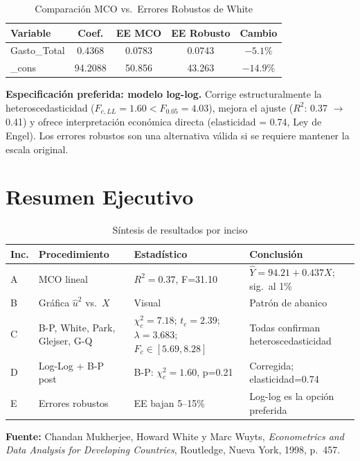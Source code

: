 \documentclass[12pt,a4paper]{article}
\begin{document}
\begin{table}[H]
\centering
\caption{Comparación MCO vs.\ Errores Robustos de White}
\begin{tabular}{lcccc}
\toprule
\textbf{Variable} & \textbf{Coef.} & \textbf{EE MCO} & \textbf{EE Robusto} & \textbf{Cambio}\\
\midrule
Gasto\_Total & 0.4368 & 0.0783 & 0.0743 & $-5.1\%$\\
\_cons       & 94.2088 & 50.856 & 43.263 & $-14.9\%$\\
\bottomrule
\end{tabular}
\end{table}

\begin{cajaconclucion}[title=Decisión Final]
\textbf{Especificación preferida: modelo log-log.}
Corrige estructuralmente la heteroscedasticidad ($F_{c,LL}=1.60 < F_{0.05}=4.03$),
mejora el ajuste ($R^2$: 0.37 $\to$ 0.41) y ofrece interpretación económica directa
(elasticidad = 0.74, Ley de Engel).
Los errores robustos son una alternativa válida si se requiere mantener la escala original.
\end{cajaconclucion}

\section{Resumen Ejecutivo}

\begin{table}[H]
\centering
\caption{Síntesis de resultados por inciso}
\begin{tabular}{p{0.8cm}p{4.5cm}p{3.2cm}p{4.5cm}}
\toprule
\textbf{Inc.} & \textbf{Procedimiento} & \textbf{Estadístico} & \textbf{Conclusión}\\
\midrule
A & MCO lineal & $R^2=0.37$, F=31.10 & $\hat{Y}=94.21+0.437X$; sig.\ al 1\%\\
\addlinespace
B & Gráfica $\hat{u}^2$ vs.\ $X$ & Visual & Patrón de abanico\\
\addlinespace
C & B-P, White, Park, Glejser, G-Q &
  $\chi^2_c=7.18$; $t_c=2.39$; $\lambda=3.683$; $F_c\in[5.69,8.28]$ &
  Todas confirman heteroscedasticidad\\
\addlinespace
D & Log-Log + B-P post & B-P: $\chi^2_c=1.60$, p=0.21 & Corregida; elasticidad=0.74\\
\addlinespace
E & Errores robustos & EE bajan 5--15\% & Log-log es la opción preferida\\
\bottomrule
\end{tabular}
\end{table}

\vspace{1em}
\noindent\textbf{Fuente:} Chandan Mukherjee, Howard White y Marc Wuyts,
\textit{Econometrics and Data Analysis for Developing Countries},
Routledge, Nueva York, 1998, p.~457.
\end{document}
